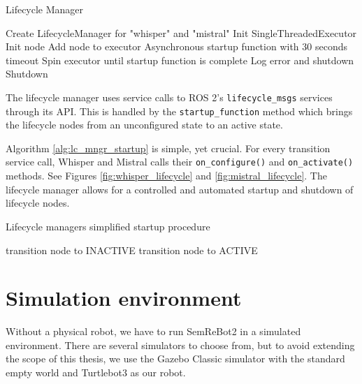 \begin{algorithm}\label{alg:lifecycle_manager}
    \caption{Lifecycle Manager}
    \begin{algorithmic}[1]
            \State Create LifecycleManager for "whisper" and "mistral"
            \State Init SingleThreadedExecutor
                \State Init node
                \State Add node to executor
            \EndFor
            \State Asynchronous startup function with 30 seconds timeout
            \State Spin executor until startup function is complete
                \State Log error and shutdown
                \State {}
            \EndIf
            \State Shutdown
            \State {}
        \EndProcedure
    \end{algorithmic}
\end{algorithm}

The lifecycle manager uses service calls to ROS 2's \verb|lifecycle_msgs| services through its API. This is handled by the \verb|startup_function| method which brings the lifecycle nodes from an unconfigured state to an active state.

Algorithm \ref{alg:lc_mngr_startup} is simple, yet crucial. For every transition service call, Whisper and Mistral calls their \verb|on_configure()| and \verb|on_activate()| methods. See Figures \ref{fig:whisper_lifecycle} and \ref{fig:mistral_lifecycle}. The lifecycle manager allows for a controlled and automated startup and shutdown of lifecycle nodes.

\begin{algorithm}\label{alg:lc_mngr_startup}
\caption{Lifecycle managers simplified startup procedure}
    \begin{algorithmic}[1]
                \State transition node to INACTIVE
            \EndFor
                \State transition node to ACTIVE
            \EndFor
        \EndFunction
    \end{algorithmic}
\end{algorithm}

\section{Simulation environment}
Without a physical robot, we have to run SemReBot2 in a simulated environment. There are several simulators to choose from, but to avoid extending the scope of this thesis, we use the Gazebo Classic simulator with the standard empty world and Turtlebot3 as our robot.

